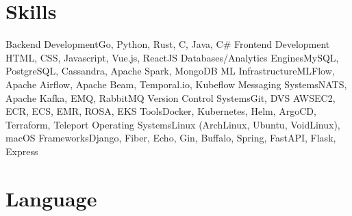 \section{Skills}

\cvcomputer%
{Backend Development}{Go, Python, Rust, C, Java, C\#}
{Frontend Development}
{HTML, CSS, Javascript, Vue.js, ReactJS}
\vspace{0.5cm}
\cvcomputer%
{Databases/Analytics Engines}{MySQL, PostgreSQL, Cassandra, Apache Spark, MongoDB}
{ML Infrastructure}{MLFlow, Apache Airflow, Apache Beam, Temporal.io, Kubeflow}
\vspace{0.5cm}
\cvcomputer%
{Messaging Systems}{NATS, Apache Kafka, EMQ, RabbitMQ}
{Version Control Systems}{Git, DVS}
\vspace{0.5cm}
\cvcomputer%
{AWS}{EC2, ECR, ECS, EMR, ROSA, EKS}
{Tools}{Docker, Kubernetes, Helm, ArgoCD, Terraform, Teleport}
\cvcomputer%
{Operating Systems}{Linux (ArchLinux, Ubuntu, VoidLinux), macOS}
{Frameworks}{Django, Fiber, Echo, Gin, Buffalo, Spring, FastAPI, Flask, Express}

\section{Language}


\emptysection{}\closesection{}
